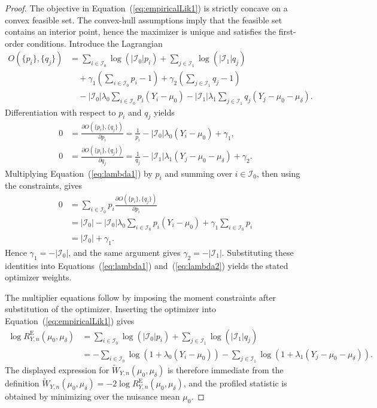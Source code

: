 \documentclass[11pt]{article}
\begin{document}
\begin{proof}
The objective in Equation~(\ref{eq:empiricalLik1}) is strictly concave on a convex feasible set. The convex-hull assumptions imply that the feasible set contains an interior point, hence the maximizer is unique and satisfies the first-order conditions. Introduce the Lagrangian
\begin{align}
  O(\{p_i\},\{q_j\})
  &= \sum_{i \in \mathcal{I}_0}\log(|\mathcal{I}_0|p_i)
   + \sum_{j \in \mathcal{I}_1}\log(|\mathcal{I}_1|q_j)\nonumber\\
  &\quad + \gamma_1\left(\sum_{i \in \mathcal{I}_0} p_i - 1\right)
   + \gamma_2\left(\sum_{j \in \mathcal{I}_1} q_j - 1\right)\nonumber\\
  &\quad - |\mathcal{I}_0|\lambda_0\sum_{i \in \mathcal{I}_0} p_i(Y_i - \mu_0)
   - |\mathcal{I}_1|\lambda_1\sum_{j \in \mathcal{I}_1} q_j(Y_j - \mu_0 - \mu_\delta).
\end{align}
Differentiation with respect to $p_i$ and $q_j$ yields
\begin{align}
  0 &= \frac{\partial O(\{p_i\},\{q_j\})}{\partial p_i}
  = \frac{1}{p_i} - |\mathcal{I}_0|\lambda_0(Y_i - \mu_0) + \gamma_1,\label{eq:lambda1}\\
  0 &= \frac{\partial O(\{p_i\},\{q_j\})}{\partial q_j}
  = \frac{1}{q_j} - |\mathcal{I}_1|\lambda_1(Y_j - \mu_0 - \mu_\delta) + \gamma_2.\label{eq:lambda2}
\end{align}
Multiplying Equation~(\ref{eq:lambda1}) by $p_i$ and summing over $i \in \mathcal{I}_0$, then using the constraints, gives
\begin{align*}
  0
  &= \sum_{i \in \mathcal{I}_0} p_i \frac{\partial O(\{p_i\},\{q_j\})}{\partial p_i}\\
  &= |\mathcal{I}_0| - |\mathcal{I}_0|\lambda_0\sum_{i \in \mathcal{I}_0} p_i(Y_i - \mu_0) + \gamma_1\sum_{i \in \mathcal{I}_0} p_i\\
  &= |\mathcal{I}_0| + \gamma_1.
\end{align*}
Hence $\gamma_1 = -|\mathcal{I}_0|$, and the same argument gives $\gamma_2 = -|\mathcal{I}_1|$. Substituting these identities into Equations~(\ref{eq:lambda1}) and~(\ref{eq:lambda2}) yields the stated optimizer weights.

The multiplier equations follow by imposing the moment constraints after substitution of the optimizer. Inserting the optimizer into Equation~(\ref{eq:empiricalLik1}) gives
\begin{align*}
  \log R_{Y,n}^{\mathrm{E}}(\mu_0,\mu_\delta)
  &= \sum_{i \in \mathcal{I}_0}\log(|\mathcal{I}_0|p_i)
   + \sum_{j \in \mathcal{I}_1}\log(|\mathcal{I}_1|q_j)\\
  &= -\sum_{i \in \mathcal{I}_0}\log\left(1 + \lambda_0(Y_i - \mu_0)\right)
     - \sum_{j \in \mathcal{I}_1}\log\left(1 + \lambda_1(Y_j - \mu_0 - \mu_\delta)\right).
\end{align*}
The displayed expression for $\widetilde{W}_{Y,n}(\mu_0,\mu_\delta)$ is therefore immediate from the definition $\widetilde{W}_{Y,n}(\mu_0,\mu_\delta) = -2\log R_{Y,n}^{\mathrm{E}}(\mu_0,\mu_\delta)$, and the profiled statistic is obtained by minimizing over the nuisance mean $\mu_0$.
\end{proof}

\clearpage


\end{document}
